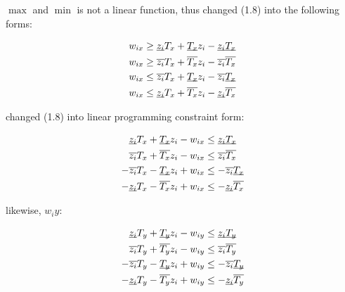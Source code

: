 \documentclass[paper=a4, fontsize=11pt]{scrartcl} %
\numberwithin{equation}{section} %
\numberwithin{figure}{section} %
\numberwithin{table}{section} %
\begin{document}
$\max$ and $\min$ is not a linear function, thus changed (1.8) into the following forms:

\begin{equation}
\begin{split}
w_{ix} &\geq \underbar{$z_{i}$} T_{x} + \underbar{$T_{x}$}z_{i} - \underbar{$z_{i}$}\underbar{$T_{x}$} \\
w_{ix} &\geq \overline{z_{i}} T_{x} + \overline{T_{x}}z_{i} - \overline{z_{i}} \overline{T_{x}} \\
w_{ix} &\leq \overline{z_{i}}T_{x} + \underbar{$T_{x}$}z_{i} - \overline{z_{i}} \underbar{$T_{x}$} \\
w_{ix} &\leq \underbar{$z_{i}$} T_{x} + \overline{T_{x}}z_{i} - \underbar{$z_{i}$} \overline{T_{x}}
\end{split}
\end{equation}

changed (1.8) into linear programming constraint form:

\begin{equation}
\begin{split}
\underbar{$z_{i}$} T_{x} + \underbar{$T_{x}$}z_{i} - w_{ix} &\leq \underbar{$z_{i}$}\underbar{$T_{x}$} \\
\overline{z_{i}} T_{x} + \overline{T_{x}}z_{i} - w_{ix} &\leq \overline{z_{i}} \overline{T_{x}} \\
- \overline{z_{i}}T_{x} - \underbar{$T_{x}$}z_{i} + w_{ix} &\leq  -\overline{z_{i}} \underbar{$T_{x}$} \\
- \underbar{$z_{i}$} T_{x} - \overline{T_{x}}z_{i} + w_{ix} &\leq -\underbar{$z_{i}$} \overline{T_{x}}
\end{split}
\end{equation}

likewise, $w_iy$: 

\begin{equation}
\begin{split}
\underbar{$z_{i}$} T_{y} + \underbar{$T_{y}$}z_{i} - w_{iy} &\leq \underbar{$z_{i}$}\underbar{$T_{y}$} \\
\overline{z_{i}} T_{y} + \overline{T_{y}}z_{i} - w_{iy} &\leq \overline{z_{i}} \overline{T_{y}} \\
- \overline{z_{i}}T_{y} - \underbar{$T_{y}$}z_{i} + w_{iy} &\leq  -\overline{z_{i}} \underbar{$T_{y}$} \\
- \underbar{$z_{i}$} T_{y} - \overline{T_{y}}z_{i} + w_{iy} &\leq - \underbar{$z_{i}$} \overline{T_{y}}
\end{split}
\end{equation}
\end{document}
